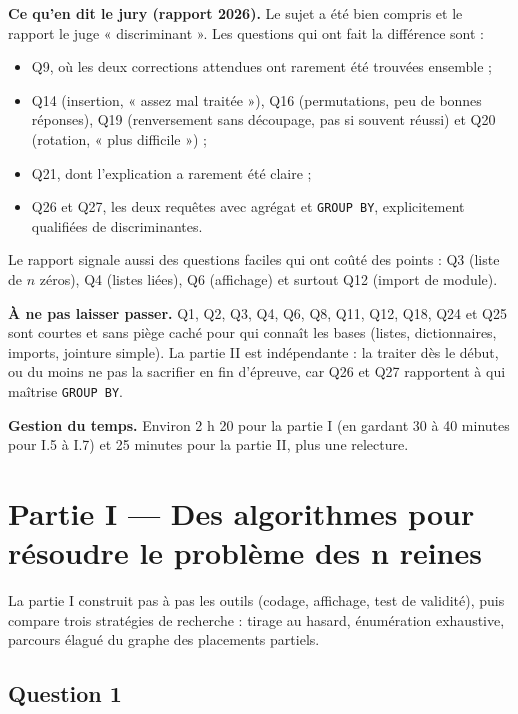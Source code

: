 \documentclass[11pt,a4paper]{article}
\providecommand{\tightlist}{\setlength{\itemsep}{0pt}\setlength{\parskip}{0pt}}
\begin{document}
\textbf{Ce qu'en dit le jury (rapport 2026).} Le sujet a été bien compris et le rapport le juge « discriminant ». Les questions qui ont fait la différence sont :

\begin{itemize}
\tightlist
\item
  Q9, où les deux corrections attendues ont rarement été trouvées ensemble ;
\item
  Q14 (insertion, « assez mal traitée »), Q16 (permutations, peu de bonnes réponses), Q19 (renversement sans découpage, pas si souvent réussi) et Q20 (rotation, « plus difficile ») ;
\item
  Q21, dont l'explication a rarement été claire ;
\item
  Q26 et Q27, les deux requêtes avec agrégat et \texttt{GROUP\ BY}, explicitement qualifiées de discriminantes.
\end{itemize}

Le rapport signale aussi des questions faciles qui ont coûté des points : Q3 (liste de \(n\) zéros), Q4 (listes liées), Q6 (affichage) et surtout Q12 (import de module).

\textbf{À ne pas laisser passer.} Q1, Q2, Q3, Q4, Q6, Q8, Q11, Q12, Q18, Q24 et Q25 sont courtes et sans piège caché pour qui connaît les bases (listes, dictionnaires, imports, jointure simple). La partie II est indépendante : la traiter dès le début, ou du moins ne pas la sacrifier en fin d'épreuve, car Q26 et Q27 rapportent à qui maîtrise \texttt{GROUP\ BY}.

\textbf{Gestion du temps.} Environ 2 h 20 pour la partie I (en gardant 30 à 40 minutes pour I.5 à I.7) et 25 minutes pour la partie II, plus une relecture.

\hypertarget{partie-i-des-algorithmes-pour-ruxe9soudre-le-probluxe8me-des-n-reines}{%
\section{Partie I --- Des algorithmes pour résoudre le problème des n reines}\label{partie-i-des-algorithmes-pour-ruxe9soudre-le-probluxe8me-des-n-reines}}

La partie I construit pas à pas les outils (codage, affichage, test de validité), puis compare trois stratégies de recherche : tirage au hasard, énumération exhaustive, parcours élagué du graphe des placements partiels.

\hypertarget{question-1}{%
\subsection{Question 1}\label{question-1}}
\end{document}
